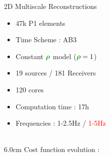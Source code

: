 \begin{frame}[noframenumbering]{2D Multiscale Reconstructions}

  \begin{multicols}{2}
    \begin{itemize}
    \item 47k P1 elements
    \item Time Scheme : AB3
    \item Constant $\density$ model ($\density=1$)
    \item 19 sources / 181 Receivers
    \item 120 cores
    \item Computation time : 17h
    \item Frequencies : 1-2.5Hz / \textcolor{red}{1-5Hz} \\ ~
    \end{itemize}
    \columnbreak

    \setlength{\plotwidth} {6.0cm}
    \setlength{\plotheight}{5cm}
    Cost function evolution :
    \begin{figure}
    \end{figure}
  \end{multicols}
\end{frame}

